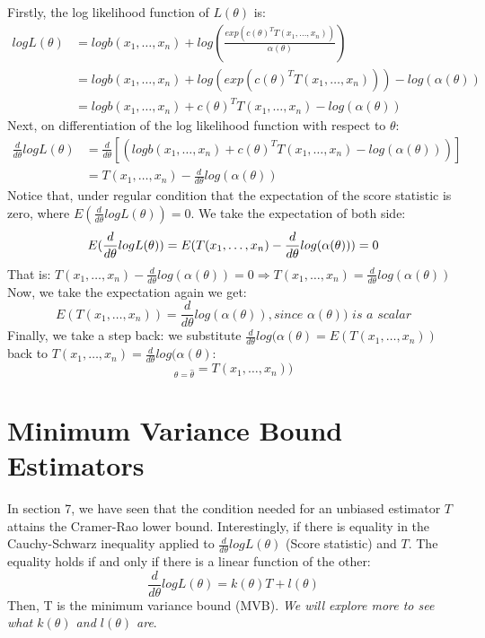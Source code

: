 \documentclass[12pt ]{article}
\begin{document}
Firstly, the log likelihood function of $L(\theta)$ is:
\begin{align*}
logL(\theta) &= log b(x_{1}, \ldots, x_{n}) + log(\frac{exp(c(\theta)^T T(x_{1}, \ldots, x_{n}))}{\alpha(\theta)}) \\
&= logb(x_{1}, \ldots, x_{n}) + log(exp(c(\theta)^T T(x_{1}, \ldots, x_{n}))) - log(\alpha(\theta)) \\
&= logb(x_{1}, \ldots, x_{n}) +c(\theta)^T T(x_{1}, \ldots, x_{n}) - log(\alpha(\theta))
\end{align*}
Next, on differentiation of the log likelihood function with respect to $\theta$:\\
\begin{align*}
\frac{d}{d\theta} logL(\theta) &= \frac{d}{d\theta} [(logb(x_{1}, \ldots, x_{n}) +c(\theta)^T T(x_{1}, \ldots, x_{n}) - log(\alpha(\theta)))] \\
&= T(x_{1}, \ldots, x_{n}) - \frac{d}{d\theta} log(\alpha(\theta))
\end{align*}
Notice that, under regular condition that the expectation of the score statistic is zero, where $E(\frac{d}{d\theta} logL(\theta)) = 0$. We take the expectation of both side:
\begin{equation*}
E(\frac{d}{d\theta} logL(\theta)) = E(T(x_{1}, \ldots, x_{n}) - \frac{d}{d\theta} log(\alpha(\theta))) = 0\\
\end{equation*}
That is: $T(x_{1}, \ldots, x_{n}) - \frac{d}{d\theta} log(\alpha(\theta)) = 0 \Rightarrow T(x_{1}, \ldots, x_{n}) =  \frac{d}{d\theta} log(\alpha(\theta))$ \\
Now, we take the expectation again we get:
\begin{equation*}
E(T(x_{1}, \ldots, x_{n})) = \frac{d}{d\theta} log(\alpha(\theta)), \textit{since $\alpha(\theta))$ is a scalar}
\end{equation*}
Finally, we take a step back: we substitute $\frac{d}{d\theta} log(\alpha(\theta) = E(T(x_{1}, \ldots, x_{n}))$ back to $T(x_{1}, \ldots, x_{n}) =  \frac{d}{d\theta} log(\alpha(\theta)$:
\begin{equation*}
[E(T(X_{1}, \ldots, X_{n}))]_{\theta = \hat{\theta}} = T(x_{1}, \ldots, x_{n}))
\end{equation*}

\section{Minimum Variance Bound Estimators}
In section 7, we have seen that the condition needed for an unbiased estimator $T$ attains the Cramer-Rao lower bound. Interestingly, if there is equality in the Cauchy-Schwarz inequality applied to $\frac{d}{d\theta} logL(\theta)$ (Score statistic) and $T$. The equality holds if and only if there is a linear function of the other:
\begin{equation}
\frac{d}{d\theta} logL(\theta) = k(\theta)T + l(\theta)
\end{equation}
Then, T is the minimum variance bound (MVB). \textit{We will explore more to see what $k(\theta)$ and $l(\theta)$ are}.\\
\end{document}
